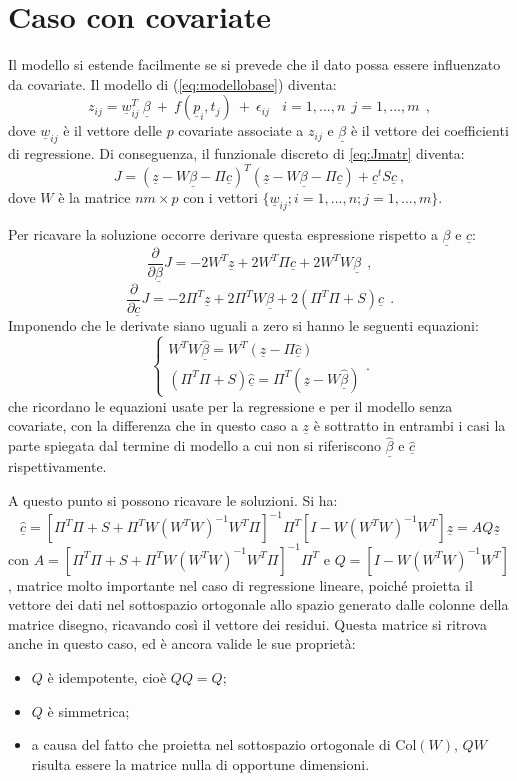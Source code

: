 \documentclass[a4paper,11pt,twoside,openright]{book}							%
\begin{document}
\section{Caso con covariate}

Il modello si estende facilmente se si prevede che il dato possa essere influenzato da covariate. Il modello di (\ref{eq:modellobase}) diventa:
\begin{equation}
\label{eq:modellobasecovar}
z_{ij}= \underline w_{ij}^T\  \underline \beta   \ + \  f(\underline p_i,t_j)\ +\ \epsilon_{ij}\ \ \ \ i = 1,...,n\ \ j=1,...,m \ \ ,
\end{equation}
dove $\underline w_{ij}$ è il vettore delle $p$ covariate associate a $z_{ij}$ e $\underline \beta$ è il vettore dei coefficienti di regressione. Di conseguenza, il funzionale discreto di \ref{eq:Jmatr} diventa:
$$ J = (\underline z - W \underline \beta - \Pi \underline c)^T (\underline z - W \underline \beta - \Pi \underline c) + \underline c^t S \underline c  \ ,$$
dove $W$ è la matrice $nm \times p$ con i vettori $ \{\underline w_{ij}; i=1,...,n;j=1,...,m\}$.

Per ricavare la soluzione occorre derivare questa espressione rispetto a $\underline \beta$ e $\underline c$:
$$
\frac{\partial}{\partial \underline \beta}J= -2W^T \underline z + 2W^T \Pi \underline c + 2 W^TW \underline \beta \ \ ,
$$
$$
\frac{\partial}{\partial \underline c}J= -2 \Pi^T \underline z + 2 \Pi^T W \underline \beta + 2(\Pi^T \Pi + S) \underline c \ \ .
$$
Imponendo che le derivate siano uguali a zero si hanno le seguenti equazioni:
$$
\begin{cases}
W^TW \hat{\underline \beta} = W^T(\underline z - \Pi \hat{\underline c})  \\
(\Pi^T \Pi + S) \hat{\underline c}=\Pi^T(\underline z -W \hat{\underline \beta})
\end{cases}.
$$
che ricordano le equazioni usate per la regressione e per il modello senza covariate, con la differenza che in questo caso a $\underline z$ è sottratto in entrambi i casi la parte spiegata dal termine di modello a cui non si riferiscono $\hat{\underline \beta}$ e $\hat{\underline c}$ rispettivamente.

A questo punto si possono ricavare le soluzioni. Si ha:
$$
\hat  {\underline c}=[\Pi^T\Pi+S+\Pi^TW(W^TW)^{-1}W^T\Pi]^{-1}\Pi^T[I-W(W^TW)^{-1}W^T]\underline z=AQ \underline z
$$
con $A=[\Pi^T\Pi+S+\Pi^TW(W^TW)^{-1}W^T\Pi]^{-1}\Pi^T$ e $Q=[I-W(W^TW)^{-1}W^T]$, matrice molto importante nel caso di regressione lineare, poiché proietta il vettore dei dati nel sottospazio ortogonale allo spazio generato dalle colonne della matrice disegno, ricavando così il vettore dei residui. Questa matrice si ritrova anche in questo caso, ed è ancora valide le sue proprietà:
\begin{itemize}
\item $Q$ è idempotente, cioè $QQ=Q$;
\item $Q$ è simmetrica;
\item a causa del fatto che proietta nel sottospazio ortogonale di $\mathrm{Col}(W)$, $QW$ risulta essere la matrice nulla di opportune dimensioni. 
\end{itemize}
\end{document}

